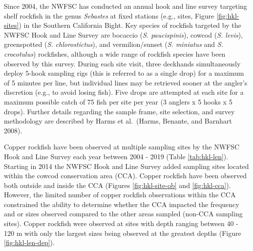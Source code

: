 \documentclass[11pt,
  english,
  a4paper,
]{article}
\begin{document}
\leavevmode\tagmcend\tagstructend


Since 2004, the NWFSC has conducted an annual hook and line survey targeting shelf rockfish in the genus \emph{Sebastes} at fixed stations (e.g., sites, Figure \ref{fig:hkl-sites}) in the Southern California Bight. Key species of rockfish targeted by the NWFSC Hook and Line Survey are bocaccio (\emph{S. paucispinis}), cowcod (\emph{S. levis}), greenspotted (\emph{S. chlorostictus}), and vermilion/sunset (\emph{S. miniatus} and \emph{S. crocotulus}) rockfishes, although a wide range of rockfish species have been observed by this survey. During each site visit, three deckhands simultaneously deploy 5-hook sampling rigs (this is referred to as a single drop) for a maximum of 5 minutes per line, but individual lines may be retrieved sooner at the angler's discretion (e.g., to avoid losing fish). Five drops are attempted at each site for a maximum possible catch of 75 fish per site per year (3 anglers x 5 hooks x 5 drops). Further details regarding the sample frame, site selection, and survey methodology are described by Harms et al.~{(Harms, Benante, and Barnhart 2008)\leavevmode\tagmcend\tagstructend}.

\leavevmode\tagmcend\tagstructend\par


Copper rockfish have been observed at multiple sampling sites by the NWFSC Hook and Line Survey each year between 2004 - 2019 (Table \ref{tab:hkl-len}). Starting in 2014 the NWFSC Hook and Line Survey added sampling sites located within the cowcod conservation area (CCA). Copper rockfish have been observed both outside and inside the CCA (Figures \ref{fig:hkl-site-ob} and \ref{fig:hkl-cca}). However, the limited number of copper rockfish observations within the CCA constrained the ability to determine whether the CCA impacted the frequency and or sizes observed compared to the other areas sampled (non-CCA sampling sites). Copper rockfish were observed at sites with depth ranging between 40 - 120 m with only the largest sizes being observed at the greatest depths (Figure \ref{fig:hkl-len-dep}).

\leavevmode\tagmcend\tagstructend\par

\end{document}
